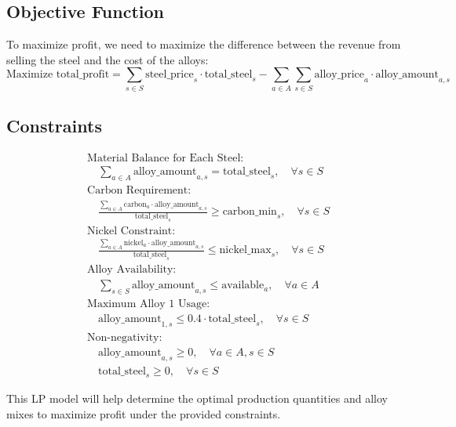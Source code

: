 \documentclass{article}
\begin{document}
\subsection*{Objective Function}
To maximize profit, we need to maximize the difference between the revenue from selling the steel and the cost of the alloys:
\[
\text{Maximize } \text{total\_profit} = \sum_{s \in S} \text{steel\_price}_s \cdot \text{total\_steel}_s - \sum_{a \in A} \sum_{s \in S} \text{alloy\_price}_a \cdot \text{alloy\_amount}_{a,s}
\]

\subsection*{Constraints}
\begin{align}
    & \text{Material Balance for Each Steel:}\\
    & \quad \sum_{a \in A} \text{alloy\_amount}_{a,s} = \text{total\_steel}_s, \quad \forall s \in S \\
    & \text{Carbon Requirement:} \\
    & \quad \frac{\sum_{a \in A} \text{carbon}_a \cdot \text{alloy\_amount}_{a,s}}{\text{total\_steel}_s} \geq \text{carbon\_min}_s, \quad \forall s \in S \\
    & \text{Nickel Constraint:} \\
    & \quad \frac{\sum_{a \in A} \text{nickel}_a \cdot \text{alloy\_amount}_{a,s}}{\text{total\_steel}_s} \leq \text{nickel\_max}_s, \quad \forall s \in S \\
    & \text{Alloy Availability:} \\
    & \quad \sum_{s \in S} \text{alloy\_amount}_{a,s} \leq \text{available}_a, \quad \forall a \in A \\
    & \text{Maximum Alloy 1 Usage:} \\
    & \quad \text{alloy\_amount}_{1,s} \leq 0.4 \cdot \text{total\_steel}_s, \quad \forall s \in S \\
    & \text{Non-negativity:} \\
    & \quad \text{alloy\_amount}_{a,s} \geq 0, \quad \forall a \in A, s \in S \\
    & \quad \text{total\_steel}_s \geq 0, \quad \forall s \in S
\end{align}

This LP model will help determine the optimal production quantities and alloy mixes to maximize profit under the provided constraints.
\end{document}
